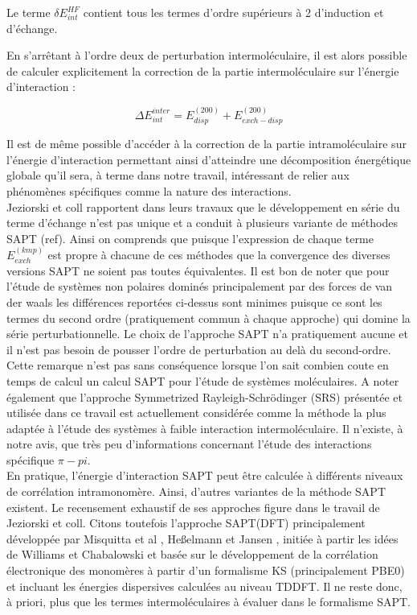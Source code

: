    				Le terme $\delta E_{int}^{HF}$ contient tous les termes d’ordre supérieurs à 2 d’induction et d’échange.
   				
   				En s’arrêtant à l’ordre deux de perturbation intermoléculaire, il est alors possible de calculer explicitement la correction de la partie intermoléculaire sur l’énergie d’interaction :
   				
   				\begin{equation}
   				\Delta E_{int}^{inter} =  E_{disp}^{(200)} + E_{exch-disp}^{(200)}
   				\end{equation}
   				
   				Il est de même possible d’accéder à la correction de la partie intramoléculaire sur l’énergie d’interaction permettant ainsi d’atteindre une décomposition énergétique globale qu’il sera, à terme dans notre travail, intéressant de relier aux phénomènes spécifiques comme la nature des interactions.\\
   				
   				Jeziorski et coll rapportent dans leurs travaux que le développement en série du terme d’échange n’est pas unique et a conduit à plusieurs variante de méthodes SAPT (ref). Ainsi on comprends que puisque l’expression de chaque terme $E_{exch}^{(kmp)}$ est propre à chacune de ces méthodes que la convergence des diverses versions SAPT ne soient pas toutes équivalentes. Il est bon de noter que pour l’étude de systèmes non polaires dominés principalement par des forces de van der waals les différences reportées ci-dessus sont minimes puisque ce sont les termes du second ordre (pratiquement commun à chaque approche) qui domine la série perturbationnelle. Le choix de l’approche SAPT n’a pratiquement aucune et il n’est pas besoin de pousser l’ordre de perturbation au delà du second-ordre. Cette remarque n’est pas sans conséquence lorsque l’on sait combien coute en temps de calcul un calcul SAPT pour l’étude de systèmes moléculaires.
   				A noter également que l’approche Symmetrized Rayleigh-Schr\"{o}dinger (SRS) présentée et utilisée dans ce travail est actuellement considérée comme la méthode la plus adaptée à l’étude des systèmes à faible interaction intermoléculaire. Il n’existe, à notre avis, que très peu d’informations concernant l’étude des interactions spécifique $\pi-pi$.\\
   					
   					
   					En pratique, l’énergie d'interaction SAPT peut être calculée à différents niveaux de corrélation
   					intramonomère. Ainsi, d’autres variantes de la méthode SAPT existent.
   					Le recensement exhaustif de ses approches figure dans le travail de Jeziorski et coll.
   					Citons toutefois l’approche SAPT(DFT) principalement développée par 
   					Misquitta et al \cite{misquitta2005intermolecular}, Heßelmann et Jansen \cite{hesselmann2002first}, initiée à partir les idées de Williams et Chabalowski \cite{williams2001using} et basée sur le développement de la corrélation électronique des monomères à partir d’un formalisme KS (principalement PBE0) et incluant les énergies dispersives calculées au niveau TDDFT.
   					Il ne reste donc, à priori, plus que les termes intermoléculaires à évaluer dans le formalisme SAPT.\\
   					
